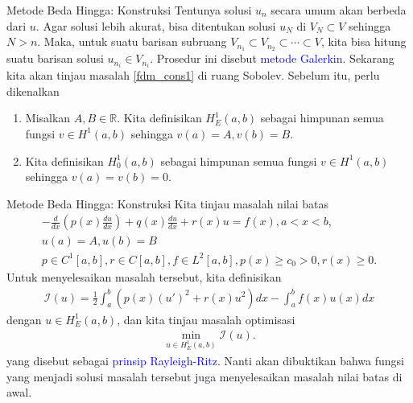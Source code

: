 \documentclass[xcolor={dvipsnames}, 9pt]{beamer}
\renewcommand{\emph}[1]{\textcolor{Blue}{#1}}
\begin{document}
	\begin{frame}{Metode Beda Hingga: Konstruksi}
		Tentunya solusi $u_n$ secara umum akan berbeda dari $u$. Agar solusi lebih akurat, bisa ditentukan solusi $u_N$ di $V_N\subset V$ sehingga $N>n$. Maka, untuk suatu barisan subruang $V_{n_1} \subset V_{n_2} \subset \cdots \subset V$, kita bisa hitung suatu barisan solusi $u_{n_i}\in V_{n_i}$. Prosedur ini disebut \emph{metode Galerkin}. \newline
		Sekarang kita akan tinjau masalah \eqref{fdm_cons1} di ruang Sobolev. Sebelum itu, perlu dikenalkan
        \begin{definition}
            \begin{enumerate}
                \item Misalkan $A,B\in\mathbb{R}$. Kita definisikan $H^1_E(a,b)$ sebagai himpunan semua fungsi $v\in H^1(a,b)$ sehingga $v(a)=A, v(b)=B$.
                \item Kita definisikan $H^1_0(a,b)$ sebagai himpunan semua fungsi $v\in H^1(a,b)$ sehingga $v(a)=v(b)=0$.
            \end{enumerate}
        \end{definition}
	\end{frame}
    \begin{frame}{Metode Beda Hingga: Konstruksi}
        Kita tinjau masalah nilai batas
        \begin{gather}
            -\frac{d}{dx}\left(p(x)\frac{du}{dx}\right) + q(x)\frac{du}{dx} + r(x)u = f(x), a<x<b, \label{mnb} \\
            u(a) = A, u(b) = B \nonumber \\
            p\in C^1[a,b], r\in C[a,b], f\in L^2[a,b], p(x)\geq c_0>0, r(x)\geq 0. \nonumber
        \end{gather}
        Untuk menyelesaikan masalah tersebut, kita definisikan
        \begin{align}\label{weakform}
            \mathcal{I}(u) = \frac{1}{2}\int_a^b (p(x)(u')^2+r(x)u^2) dx - \int_a^b f(x)u(x)dx
        \end{align}
        dengan $u\in H^1_E(a,b)$, dan kita tinjau masalah optimisasi
        \begin{align}\label{rayleighritz}
            \min_{u\in H^1_E(a,b)} \mathcal{I}(u).
        \end{align}
        yang disebut sebagai \emph{prinsip Rayleigh-Ritz}. Nanti akan dibuktikan bahwa fungsi yang menjadi solusi masalah tersebut juga menyelesaikan masalah nilai batas di awal.
    \end{frame}
\end{document}
